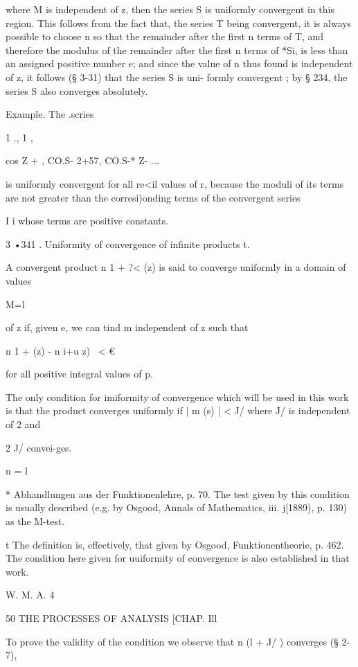 where M is independent of z, then the series S is uniformly convergent
in this region. This follows from the fact that, the series T being
convergent, it is always possible to choose n so that the remainder
after the first n terms of T, and therefore the modulus of the
remainder after the first n terms of *Si, is less than an assigned
positive number e; and since the value of n thus found is independent
of z, it follows (§ 3-31) that the series S is uni- formly convergent
; by § 234, the series S also converges absolutely.

Example. The .scries

1 ., 1 ,

cos Z + , CO.S- 2+57, CO.S-* Z- ...

is uniformly convergent for all re<il values of r, because the moduli
of its terms are not greater than the corresi)onding terms of the
convergent series

I i whose terms are positive constants.

3 •341 . Uniformity of convergence of infinite products t.

A convergent product n 1 + ?< (z) is said to converge uniformly in a
domain of values

M=l

of z if, given e, we can tind m independent of z such that

n 1 + (z) - n i+u z) \ < €

for all positive integral values of p.

The only condition for imiformity of convergence which will be used in
this work is that the product converges uniformly if | m (s) | < J/
where J/ is independent of 2 and

2 J/ convei-ges.

n = l

* Abhandlungen aus der Funktionenlehre, p. 70. The test given by this
condition is usually described (e.g. by Osgood, Annals of Mathematics,
iii. j[1889), p. 130) as the M-test.

t The definition is, effectively, that given by Osgood,
Funktionentheorie, p. 462. The condition here given for uuiformity of
convergence is also established in that work.

W. M. A. 4



50 THE PROCESSES OF ANALYSIS [CHAP. Ill

To prove the validity of the condition we observe that n (l + J/ )
converges (§ 2-7),

